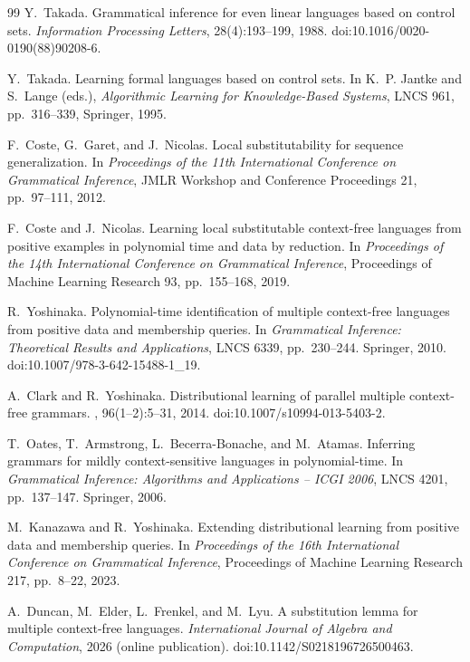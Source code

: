 \documentclass[11pt]{article}
\numberwithin{equation}{section}
\theoremstyle{plain}
\theoremstyle{definition}
\theoremstyle{remark}
\theoremstyle{plain}
\begin{document}
\begin{thebibliography}{99}
Y.~Takada.
\newblock Grammatical inference for even linear languages based on control sets.
\newblock \emph{Information Processing Letters}, 28(4):193--199, 1988.
\newblock doi:10.1016/0020-0190(88)90208-6.

Y.~Takada.
\newblock Learning formal languages based on control sets.
\newblock In K.~P. Jantke and S.~Lange (eds.), \emph{Algorithmic Learning
for Knowledge-Based Systems}, LNCS 961, pp.~316--339, Springer, 1995.

F.~Coste, G.~Garet, and J.~Nicolas.
\newblock Local substitutability for sequence generalization.
\newblock In {\em Proceedings of the 11th International Conference on
Grammatical Inference}, JMLR Workshop and Conference Proceedings 21,
pp.~97--111, 2012.

F.~Coste and J.~Nicolas.
\newblock Learning local substitutable context-free languages from positive
examples in polynomial time and data by reduction.
\newblock In {\em Proceedings of the 14th International Conference on
Grammatical Inference}, Proceedings of Machine Learning Research 93,
pp.~155--168, 2019.

R.~Yoshinaka.
\newblock Polynomial-time identification of multiple context-free languages
from positive data and membership queries.
\newblock In {\em Grammatical Inference: Theoretical Results and Applications},
LNCS 6339, pp.~230--244. Springer, 2010.
\newblock doi:10.1007/978-3-642-15488-1\_19.

A.~Clark and R.~Yoshinaka.
\newblock Distributional learning of parallel multiple context-free grammars.
, 96(1--2):5--31, 2014.
\newblock doi:10.1007/s10994-013-5403-2.

T.~Oates, T.~Armstrong, L.~Becerra-Bonache, and M.~Atamas.
\newblock Inferring grammars for mildly context-sensitive languages in polynomial-time.
\newblock In {\em Grammatical Inference: Algorithms and Applications -- ICGI 2006},
LNCS 4201, pp.~137--147. Springer, 2006.

M.~Kanazawa and R.~Yoshinaka.
\newblock Extending distributional learning from positive data and membership queries.
\newblock In {\em Proceedings of the 16th International Conference on Grammatical Inference},
Proceedings of Machine Learning Research 217, pp.~8--22, 2023.

A.~Duncan, M.~Elder, L.~Frenkel, and M.~Lyu.
\newblock A substitution lemma for multiple context-free languages.
\newblock \emph{International Journal of Algebra and Computation},
2026 (online publication).
\newblock doi:10.1142/S0218196726500463.


\end{thebibliography}
\end{document}
